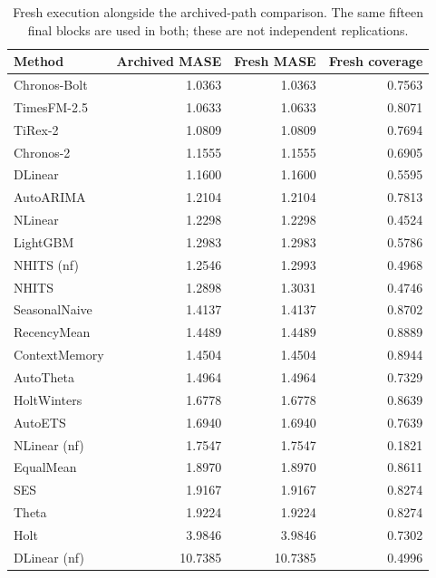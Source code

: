 \begin{longtable}{lrrr}
\caption{Fresh execution alongside the archived-path comparison. The same fifteen final blocks are used in both; these are not independent replications.}\\
\toprule Method & Archived MASE & Fresh MASE & Fresh coverage\\\midrule\endhead
Chronos-Bolt & 1.0363 & 1.0363 & 0.7563 \\
TimesFM-2.5 & 1.0633 & 1.0633 & 0.8071 \\
TiRex-2 & 1.0809 & 1.0809 & 0.7694 \\
Chronos-2 & 1.1555 & 1.1555 & 0.6905 \\
DLinear & 1.1600 & 1.1600 & 0.5595 \\
AutoARIMA & 1.2104 & 1.2104 & 0.7813 \\
NLinear & 1.2298 & 1.2298 & 0.4524 \\
LightGBM & 1.2983 & 1.2983 & 0.5786 \\
NHITS (nf) & 1.2546 & 1.2993 & 0.4968 \\
NHITS & 1.2898 & 1.3031 & 0.4746 \\
SeasonalNaive & 1.4137 & 1.4137 & 0.8702 \\
RecencyMean & 1.4489 & 1.4489 & 0.8889 \\
ContextMemory & 1.4504 & 1.4504 & 0.8944 \\
AutoTheta & 1.4964 & 1.4964 & 0.7329 \\
HoltWinters & 1.6778 & 1.6778 & 0.8639 \\
AutoETS & 1.6940 & 1.6940 & 0.7639 \\
NLinear (nf) & 1.7547 & 1.7547 & 0.1821 \\
EqualMean & 1.8970 & 1.8970 & 0.8611 \\
SES & 1.9167 & 1.9167 & 0.8274 \\
Theta & 1.9224 & 1.9224 & 0.8274 \\
Holt & 3.9846 & 3.9846 & 0.7302 \\
DLinear (nf) & 10.7385 & 10.7385 & 0.4996 \\
\bottomrule
\end{longtable}
